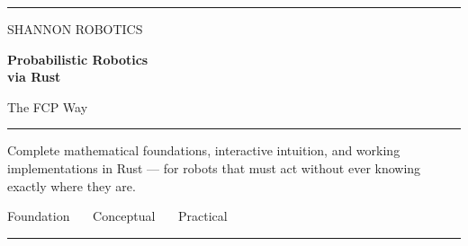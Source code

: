 \documentclass[11pt, twoside, openright]{book}
\begin{document}
\frontmatter
\pagestyle{empty}

\begin{titlepage}
\thispagestyle{empty}
\noindent
{\color{shTeal}\rule{\textwidth}{3pt}}
\vspace{2.2in}

\noindent
{\displayfont\fontsize{10}{12}\selectfont\color{shTealDark}%
 \MakeUppercase{Shannon Robotics}}

\vspace{10pt}
\noindent
{\displayfont\bfseries\fontsize{34}{39}\selectfont\color{shInk}%
 Probabilistic Robotics\\via Rust}

\vspace{12pt}
\noindent
{\displayfont\fontsize{16}{20}\selectfont\color{shInkMuted}%
 The FCP Way}

\vspace{20pt}
\noindent
{\color{shSlate300}\rule{2.4in}{0.6pt}}

\vspace{16pt}
\noindent
\begin{minipage}{4.2in}
{\fontsize{11}{15}\selectfont\color{shInkSecondary}%
 Complete mathematical foundations, interactive intuition, and working
 implementations in Rust --- for robots that must act without ever knowing
 exactly where they are.}
\end{minipage}

\vfill
\noindent
{\displayfont\fontsize{9}{12}\selectfont\color{shInkMuted}%
 Foundation \ \textperiodcentered\ \ Conceptual \ \textperiodcentered\ \ Practical}

\vspace{6pt}
\noindent
{\color{shTeal}\rule{\textwidth}{3pt}}
\end{titlepage}
\end{document}
